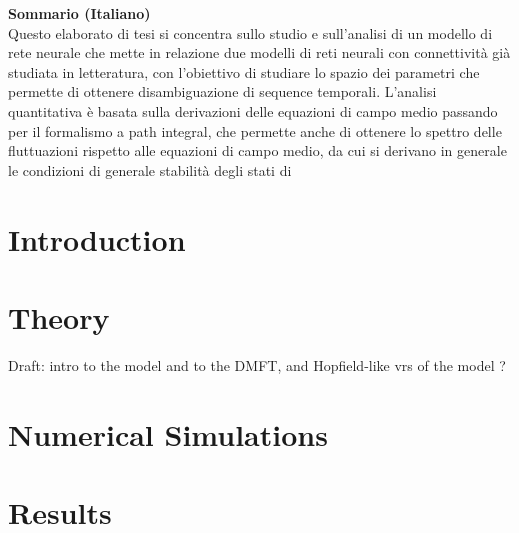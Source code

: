 \documentclass[11pt]{report}
\begin{document}
\vspace{1.5cm}

\noindent\textbf{Sommario (Italiano)} \\[0.5em]
Questo elaborato di tesi si concentra sullo studio e sull'analisi di un modello di rete neurale che mette in relazione due modelli di reti neurali con connettività già studiata in letteratura, con l'obiettivo di studiare lo spazio dei parametri che permette di ottenere disambiguazione di sequence temporali. L'analisi quantitativa è basata sulla derivazioni delle equazioni di campo medio passando per il formalismo a path integral, che permette anche di ottenere lo spettro delle fluttuazioni rispetto alle equazioni di campo medio, da cui si derivano in generale le condizioni di generale stabilità degli stati di 

\tableofcontents

\chapter{Introduction}


\chapter{Theory}
Draft: intro to the model and to the DMFT, and Hopfield-like vrs of the model ?




\chapter{Numerical Simulations}



\chapter{Results}



\appendix


\printbibliography[heading=bibintoc, title={References}]
\end{document}

